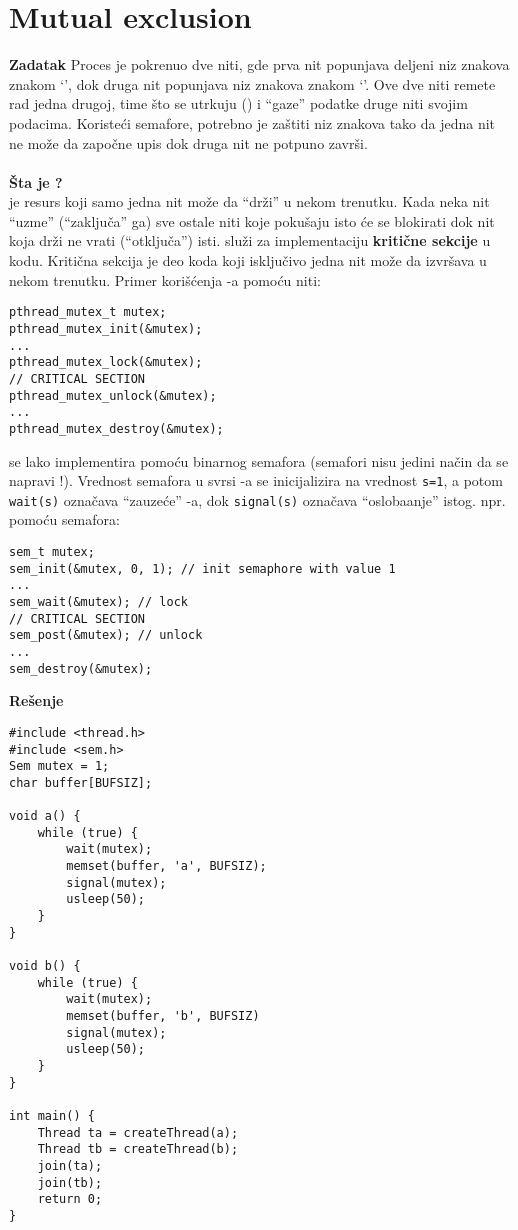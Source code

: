 \clearpage
\section{\latin Mutual exclusion}
\textbf{\large Zadatak} Proces je pokrenuo dve niti, gde prva nit popunjava deljeni niz znakova znakom `', dok druga nit popunjava niz znakova znakom `'. Ove dve niti remete rad jedna drugoj, time \v{s}to se utrkuju () i ``gaze'' podatke druge niti svojim podacima. Koriste\'{c}i semafore, potrebno je za\v{s}titi niz znakova tako da jedna nit ne mo\v{z}e da zapo\v{c}ne upis dok druga nit ne potpuno zavr\v{s}i.
\\\\
\textbf{\v{S}ta je ?}
\\
 je resurs koji samo jedna nit mo\v{z}e da ``dr\v{z}i'' u nekom trenutku. Kada neka nit ``uzme''  (``zaklju\v{c}a'' ga) sve ostale niti koje poku\v{s}aju isto \'{c}e se blokirati dok nit koja dr\v{z}i  ne vrati (``otklju\v{c}a'') isti.  slu\v{z}i za implementaciju \textbf{kriti\v{c}ne sekcije} u kodu. Kriti\v{c}na sekcija je deo koda koji isklju\v{c}ivo jedna nit mo\v{z}e da izvr\v{s}ava u nekom trenutku. Primer kori\v{s}\'{c}enja -a pomo\'{c}u  niti:
\begin{lstlisting}
pthread_mutex_t mutex;
pthread_mutex_init(&mutex);
...
pthread_mutex_lock(&mutex);
// CRITICAL SECTION
pthread_mutex_unlock(&mutex);
...
pthread_mutex_destroy(&mutex);
\end{lstlisting}
 se lako implementira pomo\'{c}u binarnog semafora (semafori nisu jedini na\v{c}in da se napravi !). Vrednost semafora u svrsi -a se inicijalizira na vrednost \texttt{s=1}, a potom \texttt{wait(s)} ozna\v{c}ava ``zauze\'{c}e'' -a, dok \texttt{signal(s)} ozna\v{c}ava ``osloba\dj{}anje'' istog.  npr. pomo\'{c}u  semafora:
\begin{lstlisting}
sem_t mutex;
sem_init(&mutex, 0, 1); // init semaphore with value 1
...
sem_wait(&mutex); // lock
// CRITICAL SECTION
sem_post(&mutex); // unlock
...
sem_destroy(&mutex);
\end{lstlisting}
\textbf{\large Re\v{s}enje}
\begin{lstlisting}
#include <thread.h>
#include <sem.h>
Sem mutex = 1;
char buffer[BUFSIZ];

void a() {
    while (true) {
        wait(mutex);
		memset(buffer, 'a', BUFSIZ);
		signal(mutex);
        usleep(50);
    }
}

void b() {
    while (true) {
        wait(mutex);
		memset(buffer, 'b', BUFSIZ)
		signal(mutex);
        usleep(50);
    }
}

int main() {
    Thread ta = createThread(a);
    Thread tb = createThread(b);
    join(ta);
    join(tb);
    return 0;
}
\end{lstlisting}